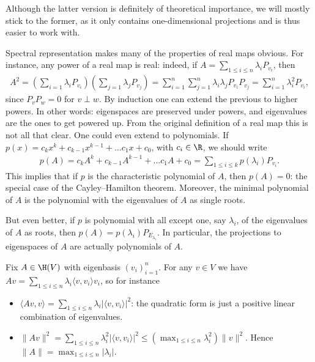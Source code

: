 Although the latter version is definitely of theoretical importance, we will mostly stick to the former, as it only contains one-dimensional projections and is thus easier to work with.

Spectral representation makes many of the properties of real maps obvious. For instance, any power of a real map is real: indeed, if $A = \sum_{1 \leq i \leq n} \lambda_{i} P_{v_{i}}$, then
\begin{align*}
	A^{2} = \left(\sum_{i = 1} \lambda_{i} P_{v_{i}}\right) \left(\sum_{j = 1} \lambda_{j} P_{v_{j}}\right) = \sum_{i = 1}^{n} \sum_{j = 1}^{n}\lambda_{i} \lambda_{j} P_{v_{i}} P_{v_{j}} = \sum_{i = 1}^{n} \lambda_{i}^2 P_{v_{i}},
\end{align*}
since $P_{v} P_{w} = 0$ for $v \perp w$. By induction one can extend the previous to higher powers. In other words: eigenspaces are preserved under powers, and eigenvalues are the ones to get powered up. From the original definition of a real map this is not all that clear. One could even extend to polynomials. If $p(x) = c_{k} x^{k} + c_{k - 1} x^{k - 1} + \ldots c_{1} x + c_{0}$, with $c_{i} \in \R$, we should write
\begin{align*}
	p(A) = c_{k} A^{k} + c_{k - 1} A^{k - 1} + \ldots c_{1} A + c_{0} = \sum_{1 \leq i \leq k} p(\lambda_{i}) P_{v_{i}}.
\end{align*}
This implies that if $p$ is the characteristic polynomial of $A$, then $p(A) = 0$: the special case of the Cayley--Hamilton theorem. Moreover, the minimal polynomial of $A$ is the polynomial with the eigenvalues of $A$ as single roots.

But even better, if $p$ is polynomial with all except one, say $\lambda_{i}$, of the eigenvalues of $A$ as roots, then $p(A) = p(\lambda_{i}) P_{E_{\lambda_{i}}}$. In particular, the projections to eigenspaces of $A$ are actually polynomials of $A$.

Fix $A \in \H(V)$ with eigenbasis $(v_{i})_{i = 1}^{n}$. For any $v \in V$ we have $A v = \sum_{1 \leq i \leq n} \lambda_{i} \langle v, v_{i} \rangle v_{i}$, so for instance

\begin{itemize}
\item $\langle A v, v \rangle = \sum_{1 \leq i \leq n} \lambda_{i} |\langle v, v_{i} \rangle|^{2}$: the quadratic form is just a positive linear combination of eigenvalues.
\item $\|A v\|^{2} = \sum_{1 \leq i \leq n} \lambda_{i}^{2} |\langle v, v_{i} \rangle|^{2} \leq \left(\max_{1 \leq i \leq n} \lambda_{i}^2 \right) \|v\|^{2}$. Hence $\|A\| = \max_{1 \leq i \leq n} |\lambda_{i}|$.
\end{itemize}


